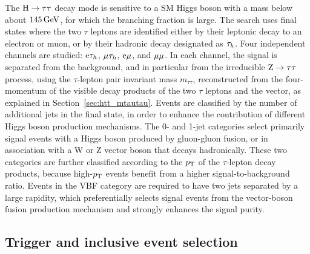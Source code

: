 \documentclass[11pt,twoside,a4paper,cmspaper,final,collab]{cms-tdr}
\begin{document}
The $\mathrm{H}\to\tau\tau$ decay mode is sensitive to a SM Higgs boson with a mass below about $145\,\text{Ge\hspace{-.08em}V}$,
for which the branching fraction is large.
The search uses final states where the two $\tau$ leptons are identified either by their leptonic decay to an electron or muon,
or by their hadronic decay designated as $\tau_h$.
Four independent channels are studied: $\mathrm{e}\tau_h$, ${\mu}\tau_h$, $\mathrm{e}{\mu}$, and  ${\mu}{\mu}$.
In each channel, the signal is separated from the background, and in particular from the irreducible $\mathrm{Z}\to\tau\tau$ process,
using the $\tau$-lepton pair invariant mass $m_{\tau\tau}$, reconstructed from the four-momentum of the visible decay products of the two $\tau$ leptons and the \MET vector,  as explained in Section~\ref{sec:htt_mtautau}.
Events are classified by the number of additional jets in the final state, in order to enhance the contribution of different
Higgs boson production mechanisms.
The 0- and 1-jet categories select primarily signal events with a Higgs boson produced by gluon-gluon fusion,
or in association with a W or Z vector boson that decays hadronically.
These two categories are further classified according to the $p_{\mathrm{T}}$ of the $\tau$-lepton decay products,
because high-$p_{\mathrm{T}}$ events benefit from a higher signal-to-background ratio.
Events in the VBF category are required to have two jets separated by a large rapidity,
which preferentially selects signal events from the vector-boson fusion production mechanism and strongly enhances the signal purity.


\subsection{Trigger and inclusive event selection}
\end{document}
